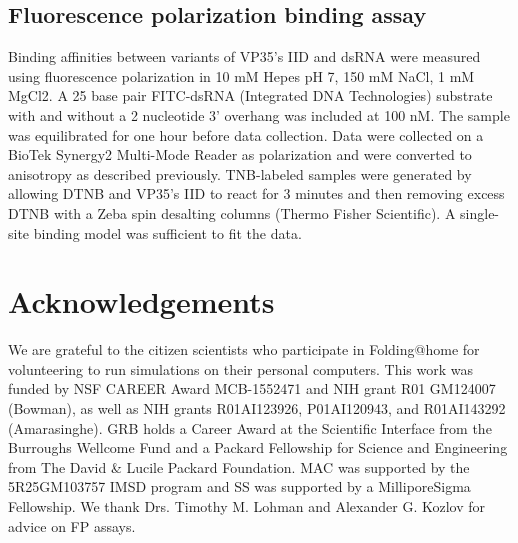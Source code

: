 \documentclass[../main.tex]{subfiles}
\begin{document}
    \subsection{Fluorescence polarization binding assay}
        Binding affinities between variants of VP35’s IID and dsRNA were measured using fluorescence polarization in 10 mM Hepes pH 7, 150 mM NaCl, 1 mM MgCl2. A 25 base pair FITC-dsRNA (Integrated DNA Technologies) substrate with and without a 2 nucleotide 3’ overhang was included at 100 nM. The sample was equilibrated for one hour before data collection. Data were collected on a BioTek Synergy2 Multi-Mode Reader as polarization and were converted to anisotropy as described previously\cite{keck_ssbdna_2012}. TNB-labeled samples were generated by allowing DTNB and VP35’s IID to react for 3 minutes and then removing excess DTNB with a Zeba spin desalting columns (Thermo Fisher Scientific). A single-site binding model was sufficient to fit the data.

\section{Acknowledgements}
    We are grateful to the citizen scientists who participate in Folding@home for volunteering to run simulations on their personal computers. This work was funded by NSF CAREER Award MCB-1552471 and NIH grant R01 GM124007 (Bowman), as well as NIH grants R01AI123926, P01AI120943, and R01AI143292 (Amarasinghe). GRB holds a Career Award at the Scientific Interface from the Burroughs Wellcome Fund and a Packard Fellowship for Science and Engineering from The David \& Lucile Packard Foundation. MAC was supported by the 5R25GM103757 IMSD program and SS was supported by a MilliporeSigma Fellowship. We thank Drs. Timothy M. Lohman and Alexander G. Kozlov for advice on FP assays. 


\end{document}
